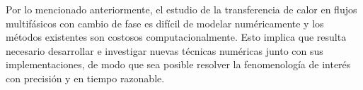 Por lo mencionado anteriormente, el estudio de la transferencia de calor en flujos multifásicos con cambio de fase es difícil de modelar numéricamente y los métodos existentes son costosos computacionalmente. Esto implica que resulta necesario desarrollar e investigar nuevas técnicas numéricas junto con sus implementaciones, de modo que  sea posible resolver la fenomenología de interés con precisión y en tiempo razonable.

%
%
%
%
%
%
%
%
